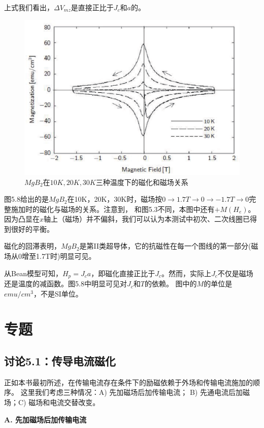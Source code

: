 上式我们看出，$\Delta V_{mz}$是直接正比于$J_c$和$a$的。
\begin{figure}[htbp]
  \centering
 \includegraphics[scale=0.7]{chpt5/figs/fig5.8.eps}
  \caption{$MgB_2$在$10K,20K,30K$三种温度下的磁化和磁场关系}\label{fig:magvfield}
\end{figure}
图5.8给出的是$MgB_2$在10K，20K，30K时，磁场按$0\rightarrow 1.7T\rightarrow 0 \rightarrow -1.7T\rightarrow 0$完整施加时的磁化与磁场的关系。注意到，
和图5.3不同，本图中还有$+M(H_e)$。因为凸显在$x$轴上（磁场）并不偏斜，我们可以认为本测试中初次、二次线圈已得到很好的平衡。

磁化的回滞表明，$MgB_2$是第II类超导体，它的抗磁性在每一个图线的第一部分(磁场从0增至1.7T时)明显可见。

从Bean模型可知，$H_p=J_c a$，即磁化直接正比于$J_c$。然而，实际上$J_c$不仅是磁场还是温度的减函数。图5.8中明显可见对$J_c$和$T$的依赖。
图中的$M$的单位是$emu/cm^3$，不是SI单位。

\section{专题}
\subsection{讨论5.1：传导电流磁化}
正如本书最初所述，在传输电流存在条件下的励磁依赖于外场和传输电流施加的顺序。
这里我们考虑三种情况：A) 先加磁场后加传输电流； B) 先通电流后加磁场；C) 磁场和电流交替改变。

\textbf{A.  先加磁场后加传输电流}

